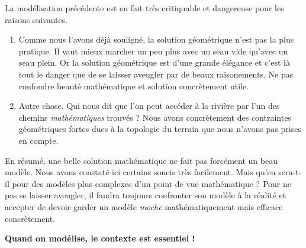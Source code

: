 La modélisation précédente est en fait très critiquable et dangereuse pour les raisons suivantes.

\begin{enumerate}
	\item Comme nous l'avons déjà souligné, la solution géométrique n'est pas la plus pratique. Il vaut mieux marcher un peu plus avec un seau vide qu'avec un seau plein. Or la solution géométrique est d'une grande élégance et c'est là tout le danger que de se laisser aveugler par de beaux raisonements. Ne pas confondre beauté mathématique et solution concrètement utile.


	\item Autre chose. Qui nous dit que l'on peut accéder à la rivière par l'un des chemins \emph{\og mathématiques \fg} trouvés ? Nous avons concrètement des contraintes géométriques fortes dues à la topologie du terrain que nous n'avons pas prises en compte.
\end{enumerate}


En résumé, une belle solution mathématique ne fait pas forcément un beau modèle. Nous avons constaté ici certains soucis très facilement. Mais qu'en sera-t-il pour des modèles plus complexes d'un point de vue mathématique ? Pour ne pas se laisser aveugler, il faudra toujours confronter son modèle à la réalité et accepter de devoir garder un modèle \emph{\og moche \fg} mathématiquement mais efficace concrètement.


\bigskip


\begin{center}
	\scalebox{2.5}{$\therefore$}

	\vspace{1em}
	
	\textbf{Quand on modélise, le contexte est essentiel !}
\end{center}
